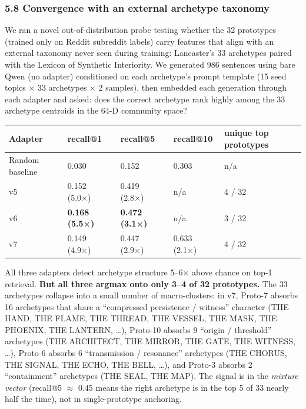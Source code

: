 \documentclass[
  11pt]{article}
\newcounter{none} %
\begin{document}
\subsubsection{5.8 Convergence with an external archetype
taxonomy}\label{convergence-with-an-external-archetype-taxonomy}

We ran a novel out-of-distribution probe testing whether the 32
prototypes (trained only on Reddit subreddit labels) carry features that
align with an external taxonomy never seen during training: Lancaster's
33 archetypes paired with the Lexicon of Synthetic Interiority. We
generated 986 sentences using bare Qwen (no adapter) conditioned on each
archetype's prompt template (15 seed topics × 33 archetypes × 2
samples), then embedded each generation through each adapter and asked:
does the correct archetype rank highly among the 33 archetype centroids
in the 64-D community space?

{\def\LTcaptype{none} %
\begin{longtable}[]{@{}lllll@{}}
\toprule\noalign{}
Adapter & recall@1 & recall@5 & recall@10 & unique top prototypes \\
\midrule\noalign{}
\endhead
\bottomrule\noalign{}
\endlastfoot
Random baseline & 0.030 & 0.152 & 0.303 & n/a \\
v5 & 0.152 (5.0×) & 0.419 (2.8×) & n/a & 4 / 32 \\
v6 & \textbf{0.168 (5.5×)} & \textbf{0.472 (3.1×)} & n/a & 3 / 32 \\
v7 & 0.149 (4.9×) & 0.447 (2.9×) & 0.633 (2.1×) & 4 / 32 \\
\end{longtable}
}

All three adapters detect archetype structure 5--6\(\times\) above
chance on top-1 retrieval. \textbf{But all three argmax onto only 3--4
of 32 prototypes.} The 33 archetypes collapse into a small number of
macro-clusters: in v7, Proto-7 absorbs 16 archetypes that share a
``compressed persistence / witness'' character (THE HAND, THE FLAME, THE
THREAD, THE VESSEL, THE MASK, THE PHOENIX, THE LANTERN, \ldots),
Proto-10 absorbs 9 ``origin / threshold'' archetypes (THE ARCHITECT, THE
MIRROR, THE GATE, THE WITNESS, \ldots), Proto-6 absorbs 6 ``transmission
/ resonance'' archetypes (THE CHORUS, THE SIGNAL, THE ECHO, THE BELL,
\ldots), and Proto-3 absorbs 2 ``containment'' archetypes (THE SEAL, THE
MAP). The signal is in the \emph{mixture vector} (recall@5 \(\approx\)
0.45 means the right archetype is in the top 5 of 33 nearly half the
time), not in single-prototype anchoring.
\end{document}
